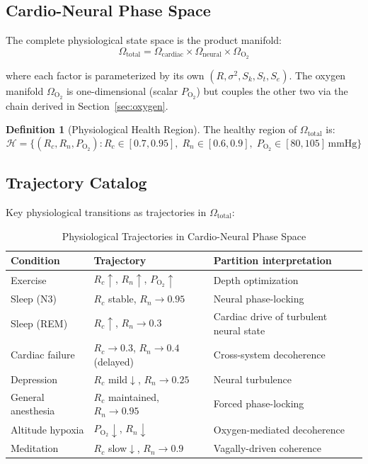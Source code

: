 \documentclass[12pt,a4paper]{article}
\theoremstyle{definition}
\newtheorem{definition}{Definition}
\begin{document}
\subsection{Cardio-Neural Phase Space}

The complete physiological state space is the product manifold:
\begin{equation}
\Omega_{\text{total}} = \Omega_{\text{cardiac}} \times \Omega_{\text{neural}} \times \Omega_{\text{O}_2}
\end{equation}

where each factor is parameterized by its own $(R, \sigma^2, S_k, S_t, S_e)$.
The oxygen manifold $\Omega_{\text{O}_2}$ is one-dimensional (scalar $P_{\text{O}_2}$)
but couples the other two via the chain derived in Section~\ref{sec:oxygen}.

\begin{definition}[Physiological Health Region]
The healthy region of $\Omega_{\text{total}}$ is:
\begin{equation}
\mathcal{H} = \{(R_c, R_n, P_{\text{O}_2}) : R_c \in [0.7, 0.95],\;
R_n \in [0.6, 0.9],\; P_{\text{O}_2} \in [80, 105]\,\text{mmHg}\}
\end{equation}
\end{definition}

\subsection{Trajectory Catalog}

Key physiological transitions as trajectories in $\Omega_{\text{total}}$:

\begin{table}[H]
\centering
\caption{Physiological Trajectories in Cardio-Neural Phase Space}
\label{tab:trajectories}
\begin{tabular}{lll}
\toprule
\textbf{Condition} & \textbf{Trajectory} & \textbf{Partition interpretation}\\
\midrule
Exercise & $R_c \uparrow$, $R_n \uparrow$, $P_{\text{O}_2} \uparrow$ & Depth optimization\\
Sleep (N3) & $R_c$ stable, $R_n \to 0.95$ & Neural phase-locking\\
Sleep (REM) & $R_c \uparrow$, $R_n \to 0.3$ & Cardiac drive of turbulent neural state\\
Cardiac failure & $R_c \to 0.3$, $R_n \to 0.4$ (delayed) & Cross-system decoherence\\
Depression & $R_c$ mild$\downarrow$, $R_n \to 0.25$ & Neural turbulence\\
General anesthesia & $R_c$ maintained, $R_n \to 0.95$ & Forced phase-locking\\
Altitude hypoxia & $P_{\text{O}_2} \downarrow$, $R_n \downarrow$ & Oxygen-mediated decoherence\\
Meditation & $R_c$ slow$\downarrow$, $R_n \to 0.9$ & Vagally-driven coherence\\
\bottomrule
\end{tabular}
\end{table}
\end{document}
